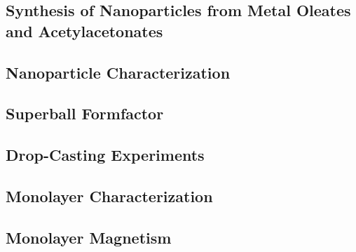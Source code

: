 \documentclass[\main/dresen_thesis.tex]{subfiles}
\renewcommand{\thisPath}{\main/chapters/monolayers/experimentalMethods/}
\begin{document}
  \subsection{Synthesis of  Nanoparticles from Metal Oleates and Acetylacetonates}
    
      \FloatBarrier

  \subsection{Nanoparticle Characterization}
    
      \FloatBarrier

  \subsection{Superball Formfactor}
    
      \FloatBarrier

  \subsection{Drop-Casting Experiments}
    
    \FloatBarrier

  \subsection{Monolayer Characterization}
    
    \FloatBarrier

  \subsection{Monolayer Magnetism}
    
    \FloatBarrier
\end{document}
